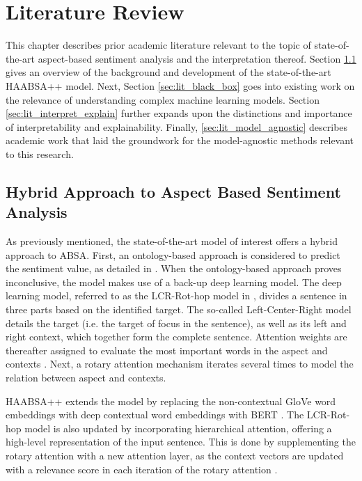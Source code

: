 \chapter{Literature Review}
    \label{chap:literature_review}

This chapter describes prior academic literature relevant to the topic of state-of-the-art aspect-based sentiment analysis and the interpretation thereof. Section \ref{sec:lit_HAABSA} gives an overview of the background and development of the state-of-the-art HAABSA++ model. Next, Section \ref{sec:lit_black_box} goes into existing work on the relevance of understanding complex machine learning models. Section \ref{sec:lit_interpret_explain} further expands upon the distinctions and importance of interpretability and explainability. Finally, \ref{sec:lit_model_agnostic} describes academic work that laid the groundwork for the model-agnostic methods relevant to this research.

\section{Hybrid Approach to Aspect Based Sentiment Analysis}
\label{sec:lit_HAABSA}
As previously mentioned, the state-of-the-art model of interest offers a hybrid approach to ABSA. First, an ontology-based approach is considered to predict the sentiment value, as detailed in \cite{Wallaart}. When the ontology-based approach proves inconclusive, the model makes use of a back-up deep learning model. The deep learning model, referred to as the LCR-Rot-hop model in \cite{Wallaart}, divides a sentence in three parts based on the identified target. The so-called Left-Center-Right model details the target (i.e. the target of focus in the sentence), as well as its left and right context, which together form the complete sentence. Attention weights are thereafter assigned to evaluate the most important words in the aspect and contexts \cite{Zheng}. Next, a rotary attention mechanism iterates several times to model the relation between aspect and contexts.

HAABSA++ extends the model by replacing the non-contextual GloVe word embeddings with deep contextual word embeddings with BERT \cite{Devlin}. The LCR-Rot-hop model is also updated by incorporating hierarchical attention, offering a high-level representation of the input sentence. This is done by supplementing the rotary attention with a new attention layer, as the context vectors are updated with a relevance score in each iteration of the rotary attention \cite{Trusca}.

